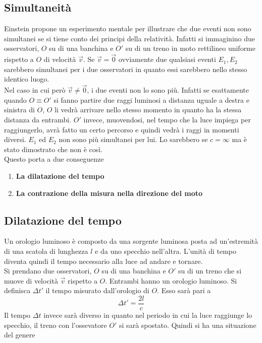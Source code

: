 \subsection{Simultaneità}
Einstein propone un esperimento mentale per illustrare che due eventi non sono simultanei se si tiene
conto dei principi della relatività. Infatti si immaginino due osservatori, $O$ su di una banchina
e $O'$ su di un treno in moto rettilineo uniforme rispetto a $O$ di velocità $\vec{v}$. Se 
$\vec{v}=\vec{0}$ ovviamente due qualsiasi eventi $E_1,E_2$ sarebbero simultanei per i due 
osservatori in quanto essi sarebbero nello stesso identico luogo.\\
Nel caso in cui però $\vec{v}\neq\vec{0}$, i due eventi non lo sono più. Infatti se esattamente 
quando $O\equiv O'$ si fanno partire due raggi luminosi a distanza uguale a destra e sinistra di $O$,
$O$ li vedrà arrivare nello stesso momento in quanto ha la stessa distanza da entrambi. $O'$ invece,
muovendosi, nel tempo che la luce impiega per raggiungerlo, avrà fatto un certo percorso e quindi 
vedrà i raggi in momenti diversi. $E_1$ ed $E_2$ non sono più simultanei per lui. Lo sarebbero se
$c=\infty$ ma è stato dimostrato che non è così.\\
Questo porta a due conseguenze
\begin{enumerate}
  \item \textbf{La dilatazione del tempo}
  \item \textbf{La contrazione della misura nella direzione del moto} 
\end{enumerate}

\subsection{Dilatazione del tempo}
Un orologio luminoso è composto da una sorgente luminosa posta ad un'estremità di una scatola di 
lunghezza $l$ e da uno specchio nell'altra. L'unità di tempo diventa quindi il tempo necessario alla
luce ad andare e tornare.\\
Si prendano due osservatori, $O$ su di una banchina e $O'$ su di un treno che si muove di velocità
$\vec{v}$ rispetto a $O$. Entrambi hanno un orologio luminoso. Si definisca $\Delta t'$ il tempo
misurato dall'orologio di $O$. Esso sarà pari a
\begin{equation*}
  \Delta t' = \frac{2l}{c}
\end{equation*}
Il tempo $\Delta t$ invece sarà diverso in quanto nel periodo in cui la luce raggiunge lo specchio,
il treno con l'ossevatore $O'$ si sarà spostato. Quindi si ha una situazione del genere
\begin{center}
\end{center}

